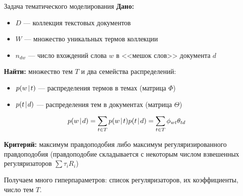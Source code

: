 \begin{frame}[t]{Задача тематического моделирования}
\textbf{Дано:}
\begin{itemize}
    \item $D$ --- коллекция текстовых документов
    \item $W$ --- множество уникальных термов коллекции
    \item $n_{dw}$ --- число вхождений слова $w$ в <<мешок слов>> документа $d$
\end{itemize}

\medskip
\textbf{Найти:}
множество тем $T$ и два семейства распределений:
\smallskip
\begin{itemize}
    \item $p(w \mspace{2mu}{|}\mspace{2mu} t)$ --- распределения термов в темах (матрица $\Phi$)
    \item $p(t \mspace{2mu}{|}\mspace{2mu} d)$ --- распределения тем в документах (матрица $\Theta$)
\end{itemize}

\[
p(w \mspace{2mu}{|}\mspace{2mu} d) = \sum_{t \in T} p(w \mspace{2mu}{|}\mspace{2mu} t)p(t \mspace{2mu}{|}\mspace{2mu} d) = \sum_{t \in T} \phi_{wt}\theta_{td}
\]

\smallskip
\textbf{Критерий:} максимум правдоподобия либо максимум регуляризированного правдоподобия (правдоподобие складывается с некоторым числом взвешенных регуляризаторов $\sum \tau_i R_i$)

Получаем много гиперпараметров: список регуляризаторов, их коэффициенты, число тем $T$.
\end{frame}


